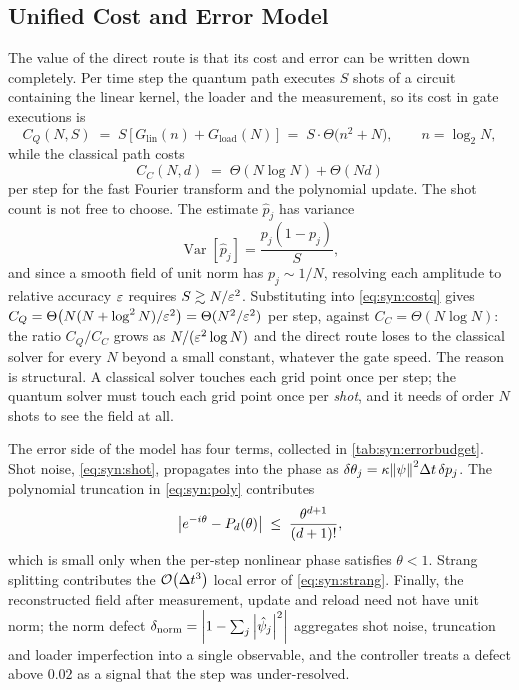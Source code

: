 \subsection{Unified Cost and Error Model}\label{sec:syn:costmodel}

The value of the direct route is that its cost and error can be written down completely. Per time step the quantum path executes $S$ shots of a circuit containing the linear kernel, the loader and the measurement, so its cost in gate executions is
\begin{equation}\label{eq:syn:costq}
  C_Q(N,S) \;=\; S\,\big[\,G_{\mathrm{lin}}(n) + G_{\mathrm{load}}(N)\,\big]
  \;=\; S\cdot\Theta\!\big(n^{2}+N\big),\qquad n=\log_2 N,
\end{equation}
while the classical path costs
\begin{equation}\label{eq:syn:costc}
  C_C(N,d) \;=\; \Theta(N\log N) + \Theta(Nd)
\end{equation}
per step for the fast Fourier transform and the polynomial update. The shot count is not free to choose. The estimate $\hat p_j$ has variance
\begin{equation}\label{eq:syn:shot}
  \operatorname{Var}[\hat p_j]=\frac{p_j(1-p_j)}{S},
\end{equation}
and since a smooth field of unit norm has $p_j\sim 1/N$, resolving each amplitude to relative accuracy $\varepsilon$ requires $S\gtrsim N/\varepsilon^{2}$. Substituting into \cref{eq:syn:costq} gives $C_Q=\Theta\big(N(N+\log^{2}N)/\varepsilon^{2}\big)=\Theta(N^{2}/\varepsilon^{2})$ per step, against $C_C=\Theta(N\log N)$: the ratio $C_Q/C_C$ grows as $N/(\varepsilon^{2}\log N)$ and the direct route loses to the classical solver for every $N$ beyond a small constant, whatever the gate speed. The reason is structural. A classical solver touches each grid point once per step; the quantum solver must touch each grid point once per \emph{shot}, and it needs of order $N$ shots to see the field at all.

The error side of the model has four terms, collected in \cref{tab:syn:errorbudget}. Shot noise, \cref{eq:syn:shot}, propagates into the phase as $\delta\theta_j=\kappa\norm{\psi}^{2}\Delta t\,\delta p_j$. The polynomial truncation in \cref{eq:syn:poly} contributes
\begin{equation}\label{eq:syn:trunc}
  \abs{e^{-i\theta}-P_d(\theta)}\;\le\;\frac{\theta^{d+1}}{(d+1)!},
\end{equation}
which is small only when the per-step nonlinear phase satisfies $\theta<1$. Strang splitting contributes the $\mathcal{O}\!\left(\Delta t^{3}\right)$ local error of \cref{eq:syn:strang}. Finally, the reconstructed field after measurement, update and reload need not have unit norm; the norm defect $\delta_{\mathrm{norm}}=\abs{1-\sum_j\abs{\hat\psi_j}^{2}}$ aggregates shot noise, truncation and loader imperfection into a single observable, and the controller treats a defect above $0.02$ as a signal that the step was under-resolved.

